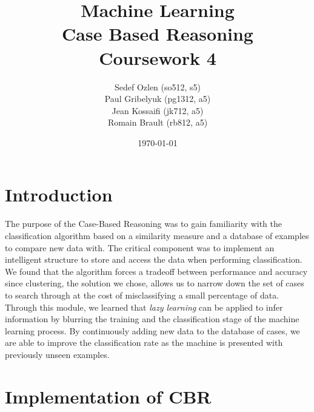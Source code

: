 \documentclass[a4paper,12pt,oneside,final]{report}
\author{
    Sedef Ozlen (so512, s5) \\ 
    Paul Gribelyuk (pg1312, a5) \\
    Jean Kossaifi (jk712, a5) \\ 
    Romain Brault (rb812, a5)
}
\title{\Huge Machine Learning \\ Case Based Reasoning \\ Coursework 4}
\date{\today}
\begin{document}
\maketitle
\tableofcontents
\listoffigures

\chapter{Introduction}
The purpose of the Case-Based Reasoning was to gain familiarity with the classification algorithm based on a similarity measure and a database of examples to compare new data with.  The critical component was to implement an intelligent structure to store and access the data when performing classification.  We found that the algorithm forces a tradeoff between performance and accuracy since clustering, the solution we chose, allows us to narrow down the set of cases to search through at the cost of misclassifying a small percentage of data.  
Through this module, we learned that \emph{lazy learning} can be applied to infer information by blurring the training and the classification stage of the machine learning process.  By continuously adding new data to the database of cases, we are able to improve the classification rate as the machine is presented with previously unseen examples.

\chapter{Implementation of CBR}
\end{document}
